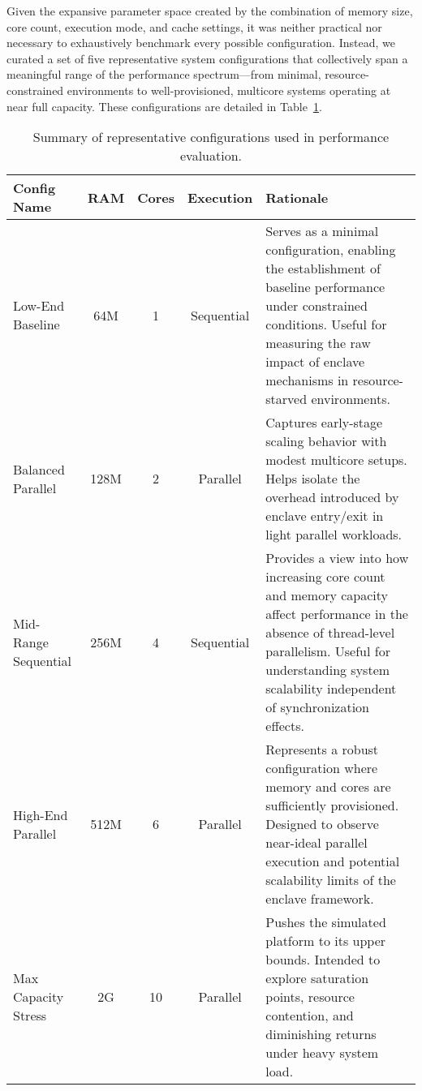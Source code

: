 Given the expansive parameter space created by the combination of memory size, core count, execution mode, and cache settings, it was neither practical nor necessary to exhaustively benchmark every possible configuration. Instead, we curated a set of five representative system configurations that collectively span a meaningful range of the performance spectrum—from minimal, resource-constrained environments to well-provisioned, multicore systems operating at near full capacity. These configurations are detailed in Table~\ref{tab:configurations}.

\begin{table}[h]
\centering
\begin{tabular}{|l|c|c|c|p{7.5cm}|}
\hline
\textbf{Config Name} & \textbf{RAM} & \textbf{Cores} & \textbf{Execution} & \textbf{Rationale} \\
\hline
Low-End Baseline     & 64M         & 1             & Sequential         & Serves as a minimal configuration, enabling the establishment of baseline performance under constrained conditions. Useful for measuring the raw impact of enclave mechanisms in resource-starved environments. \\
\hline
Balanced Parallel    & 128M        & 2             & Parallel           & Captures early-stage scaling behavior with modest multicore setups. Helps isolate the overhead introduced by enclave entry/exit in light parallel workloads. \\
\hline
Mid-Range Sequential & 256M        & 4             & Sequential         & Provides a view into how increasing core count and memory capacity affect performance in the absence of thread-level parallelism. Useful for understanding system scalability independent of synchronization effects. \\
\hline
High-End Parallel    & 512M        & 6             & Parallel           & Represents a robust configuration where memory and cores are sufficiently provisioned. Designed to observe near-ideal parallel execution and potential scalability limits of the enclave framework. \\
\hline
Max Capacity Stress  & 2G          & 10            & Parallel           & Pushes the simulated platform to its upper bounds. Intended to explore saturation points, resource contention, and diminishing returns under heavy system load. \\
\hline
\end{tabular}
\caption{Summary of representative configurations used in performance evaluation.}
\label{tab:configurations}
\end{table}

